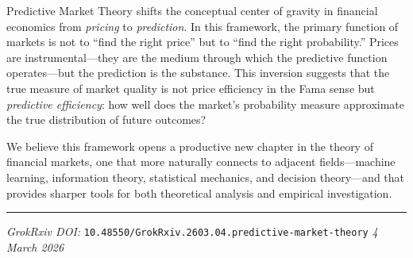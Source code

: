 \documentclass[12pt,a4paper]{article}
\theoremstyle{definition}
\begin{document}
Predictive Market Theory shifts the conceptual center of gravity in financial economics from \emph{pricing} to \emph{prediction}. In this framework, the primary function of markets is not to ``find the right price'' but to ``find the right probability.'' Prices are instrumental---they are the medium through which the predictive function operates---but the prediction is the substance. This inversion suggests that the true measure of market quality is not price efficiency in the Fama sense but \emph{predictive efficiency}: how well does the market's probability measure approximate the true distribution of future outcomes?

We believe this framework opens a productive new chapter in the theory of financial markets, one that more naturally connects to adjacent fields---machine learning, information theory, statistical mechanics, and decision theory---and that provides sharper tools for both theoretical analysis and empirical investigation.

\vspace{1em}
\noindent\rule{\textwidth}{0.5pt}
\noindent\textit{GrokRxiv DOI:} \texttt{10.48550/GrokRxiv.2603.04.predictive-market-theory}
\hfill \textit{4 March 2026}


\end{document}
